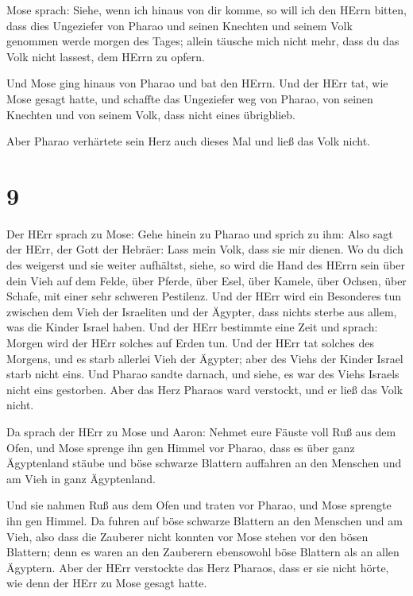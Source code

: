  Mose sprach: Siehe, wenn ich hinaus von dir komme, so will
ich den HErrn bitten, dass dies Ungeziefer von Pharao und seinen
Knechten und seinem Volk genommen werde morgen des Tages; allein täusche
mich nicht mehr, dass du das Volk nicht lassest, dem HErrn zu opfern.

 Und Mose ging hinaus von Pharao und bat den HErrn.
 Und der HErr tat, wie Mose gesagt hatte, und schaffte das
Ungeziefer weg von Pharao, von seinen Knechten und von seinem Volk, dass
nicht eines übrigblieb.

 Aber Pharao verhärtete sein Herz auch dieses Mal und ließ
das Volk nicht.

\hypertarget{section-1}{%
\section{9}\label{section-1}}

 Der HErr sprach zu Mose: Gehe hinein zu Pharao und sprich
zu ihm: Also sagt der HErr, der Gott der Hebräer: Lass mein Volk, dass
sie mir dienen.  Wo du dich des weigerst und sie weiter
aufhältst,  siehe, so wird die Hand des HErrn sein über dein
Vieh auf dem Felde, über Pferde, über Esel, über Kamele, über Ochsen,
über Schafe, mit einer sehr schweren Pestilenz.  Und der
HErr wird ein Besonderes tun zwischen dem Vieh der Israeliten und der
Ägypter, dass nichts sterbe aus allem, was die Kinder Israel haben.
 Und der HErr bestimmte eine Zeit und sprach: Morgen wird
der HErr solches auf Erden tun.  Und der HErr tat solches
des Morgens, und es starb allerlei Vieh der Ägypter; aber des Viehs der
Kinder Israel starb nicht eins.  Und Pharao sandte darnach,
und siehe, es war des Viehs Israels nicht eins gestorben. Aber das Herz
Pharaos ward verstockt, und er ließ das Volk nicht.

 Da sprach der HErr zu Mose und Aaron: Nehmet eure Fäuste
voll Ruß aus dem Ofen, und Mose sprenge ihn gen Himmel vor Pharao,
 dass es über ganz Ägyptenland stäube und böse schwarze
Blattern auffahren an den Menschen und am Vieh in ganz Ägyptenland.

 Und sie nahmen Ruß aus dem Ofen und traten vor Pharao, und
Mose sprengte ihn gen Himmel. Da fuhren auf böse schwarze Blattern an
den Menschen und am Vieh,  also dass die Zauberer nicht
konnten vor Mose stehen vor den bösen Blattern; denn es waren an den
Zauberern ebensowohl böse Blattern als an allen Ägyptern. 
Aber der HErr verstockte das Herz Pharaos, dass er sie nicht hörte, wie
denn der HErr zu Mose gesagt hatte.

